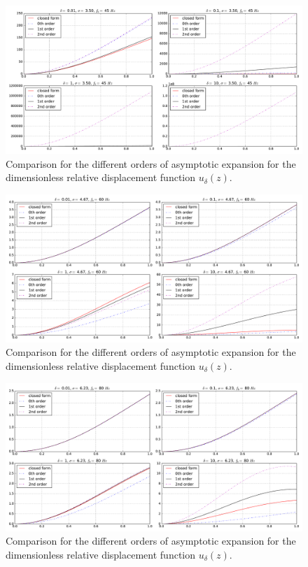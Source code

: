 \documentclass{article}
\begin{document}
\begin{figure}[!htbp]
    \centering
    \includegraphics[width=\textwidth]{./img_eig_asy/fig_sol_analytic_disp_cmp_fr045}
    \caption{Comparison for the different orders of asymptotic expansion for the dimensionless relative displacement function $u_\delta(z)$.}
    \label{fig:fig_sol_analytic_disp_cmp_fr045}
\end{figure}


\begin{figure}[!htbp]
    \centering
    \includegraphics[width=\textwidth]{./img_eig_asy/fig_sol_analytic_disp_cmp_fr060}
    \caption{Comparison for the different orders of asymptotic expansion for the dimensionless relative displacement function $u_\delta(z)$.}
    \label{fig:fig_sol_analytic_disp_cmp_fr060}
\end{figure}


\begin{figure}[!htbp]
    \centering
    \includegraphics[width=\textwidth]{./img_eig_asy/fig_sol_analytic_disp_cmp_fr080}
    \caption{Comparison for the different orders of asymptotic expansion for the dimensionless relative displacement function $u_\delta(z)$.}
    \label{fig:fig_sol_analytic_disp_cmp_fr080}
\end{figure}
\end{document}

